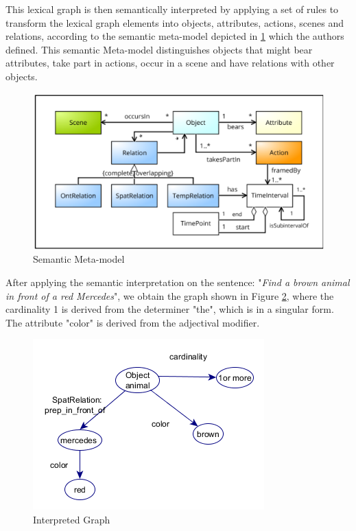 \begin{itemize}
	  	This lexical graph is then semantically interpreted by applying a set of rules to transform the lexical graph elements into objects, attributes,  actions, scenes and relations, according to the semantic meta-model depicted in \ref{model} which the authors defined.
This semantic Meta-model distinguishes objects that might bear attributes, take part in actions, occur in a scene and have relations with other objects.
\begin{figure}[!hb]
	  \centering
	  \includegraphics[scale=0.6]{graphics/SMM.png} 
	  \caption{Semantic Meta-model}
	  \label{model}
\end{figure}
After applying the semantic interpretation on the sentence: "\textit{Find a brown animal in front of a red Mercedes}", we obtain the graph shown in Figure \ref{sem}, where the cardinality 1 is derived from the determiner "the", which is in a singular form. The attribute "color" is derived from the adjectival modifier.  
	\begin{figure}[!hb]
	  \centering
	  \includegraphics[scale=0.6]{graphics/attrG.png} 
	  \caption{Interpreted Graph}
	  \label{sem}
\end{figure}

\end{itemize}
